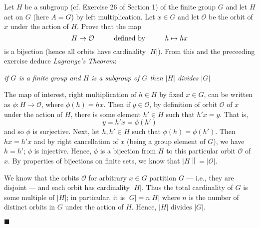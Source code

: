 \documentclass[12pt]{article}
\renewcommand{\qed}{\hfill$\blacksquare$}
\renewenvironment{proof}{\begin{addmargin}[1em]{0em}\begin{newproof}}{\end{newproof}\end{addmargin}\qed}
\newenvironment{problem}[2][Exercise]{\begin{trivlist}
\item[\hskip \labelsep {\bfseries #1}\hskip \labelsep {\bfseries #2.}]}{\end{trivlist}}
\begin{document}
\begin{problem}{1.7.19}
Let $H$ be a subgroup (cf. Exercise 26 of Section 1) of the finite group $G$ and let $H$ act on $G$ (here $A=G$) by left multiplication. Let $x\in G$ and let $\mathcal{O}$ be the orbit of $x$ under the action of $H$. Prove that the map $$ H\rightarrow \mathcal{O} \hspace{10mm} \text{defined by} \hspace{10mm} h\mapsto hx $$ is a bijection (hence all orbits have cardinality $\left|H\right|$). From this and the preceeding exercise deduce \textit{Lagrange's Theorem}:
\begin{center}
    \textit{if $G$ is a finite group and $H$ is a subgroup of $G$ then $\left|H\right|$ divides $\left|G\right|$}
\end{center}
\end{problem}
\begin{proof}
The map of interest, right multiplication of $h\in H$ by fixed $x\in G$, can be written as $\phi:H\rightarrow \mathcal{O}$, where $\phi\left(h\right) = hx$. Then if $y\in \mathcal{O}$, by definition of orbit $\mathcal{O}$ of $x$ under the action of $H$, there is some element $h'\in H$ such that $h'x = y$. That is, $$ y = h'x = \phi\left(h'\right) $$ and so $\phi$ is surjective. Next, let $h,h'\in H$ such that $\phi\left(h\right)=\phi\left(h'\right)$. Then $hx=h'x$ and by right cancellation of $x$ (being a group element of $G$), we have $h=h'$; $\phi$ is injective. Hence, $\phi$ is a bijection from $H$ to this particular orbit $\mathcal{O}$ of $x$. By properties of bijections on finite sets, we know that $\left|H\right\| = \left|\mathcal{O}\right|$.

We know that the orbits $\mathcal{O}$ for arbitrary $x\in G$ partition $G$ --- i.e., they are disjoint --- and each orbit has cardinality $\left|H\right|$. Thus the total cardinality of $G$ is some multiple of $\left|H\right|$; in particular, it is $\left|G\right| = n \left|H\right|$ where $n$ is the number of distinct orbits in $G$ under the action of $H$. Hence, $\left|H\right|$ divides $\left|G\right|$.
\end{proof}
\end{document}
